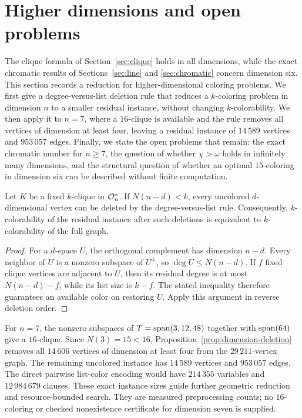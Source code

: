 \section{Higher dimensions and open problems}
\label{sec:higher}
The clique formula of Section~\ref{sec:clique} holds in all dimensions,
while the exact chromatic results of Sections~\ref{sec:line} and
\ref{sec:chromatic} concern dimension six. This section records a
reduction for higher-dimensional coloring problems. We first give a degree-versus-list deletion
rule that reduces a \(k\)-coloring problem in dimension \(n\) to a
smaller residual instance, without changing \(k\)-colorability.
We then apply it to \(n=7\), where a \(16\)-clique is available and
the rule removes all vertices of dimension at least four, leaving a
residual instance of \(14\,589\) vertices and \(953\,057\) edges.
Finally, we state the open problems that remain: the exact
chromatic number for \(n\ge7\), the question of whether
\(\chi>\omega\) holds in infinitely many dimensions, and the structural
question of whether an optimal \(15\)-coloring in dimension six
can be described without finite computation.
\begin{proposition}\label{prop:dimension-deletion}
Let \(K\) be a fixed \(k\)-clique in \(\mathcal O_n^*\).  If \(N(n-d)<k\),
every uncolored \(d\)-dimensional vertex can be deleted by the
degree-versus-list rule.  Consequently, \(k\)-colorability of the
residual instance after such deletions is equivalent to
\(k\)-colorability of the full graph.
\end{proposition}
\begin{proof}
For a \(d\)-space \(U\), the orthogonal complement has dimension
\(n-d\).  Every neighbor of \(U\) is a nonzero subspace of
\(U^\perp\), so \(\deg U\leq N(n-d)\).  If \(f\) fixed clique
vertices are adjacent to \(U\), then its residual degree is at most
\(N(n-d)-f\), while its list size is \(k-f\).  The stated inequality
therefore guarantees an available color on restoring \(U\).  Apply
this argument in reverse deletion order.
\end{proof}

For \(n=7\), the nonzero subspaces of \(T=\operatorname{span}(3,12,48)\) together
with \(\operatorname{span}(64)\) give a \(16\)-clique.  Since \(N(3)=15<16\),
Proposition~\ref{prop:dimension-deletion} removes all \(14\,606\)
vertices of dimension at least four from the \(29\,211\)-vertex
graph.  The remaining uncolored instance has \(14\,589\) vertices
and \(953\,057\) edges.  The direct pairwise list-color encoding
would have \(214\,355\) variables and \(12\,984\,679\) clauses.
These exact instance sizes guide further geometric reduction and
resource-bounded search.  They are measured preprocessing counts;
no \(16\)-coloring or checked nonexistence certificate for
dimension seven is supplied.

